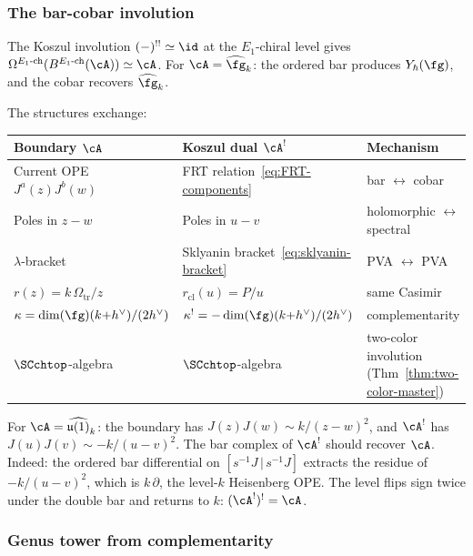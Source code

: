 \subsubsection*{The bar-cobar involution}

The Koszul involution $(-)^{!!} \simeq \id$ at the
$E_1$-chiral level gives
$\Omega^{E_1\text{-ch}}(B^{E_1\text{-ch}}(\cA)) \simeq \cA$.
For $\cA = \widehat{\fg}_k$: the ordered bar produces
$Y_\hbar(\fg)$, and the cobar recovers $\widehat{\fg}_k$.

The structures exchange:
\begin{center}
\small
\renewcommand{\arraystretch}{1.15}
\begin{tabular}{lll}
\textbf{Boundary $\cA$} &
 \textbf{Koszul dual $\cA^!$} &
 \textbf{Mechanism} \\
\hline
Current OPE $J^a(z)J^b(w)$ &
 FRT relation~\eqref{eq:FRT-components} &
 bar $\leftrightarrow$ cobar \\[2pt]
Poles in $z - w$ &
 Poles in $u - v$ &
 holomorphic $\leftrightarrow$ spectral \\[2pt]
$\lambda$-bracket &
 Sklyanin bracket~\eqref{eq:sklyanin-bracket} &
 PVA $\leftrightarrow$ PVA \\[2pt]
$r(z) = k\,\Omega_{\mathrm{tr}}/z$ &
 $r_{\mathrm{cl}}(u) = P/u$ &
 same Casimir \\[2pt]
$\kappa = \dim(\fg)(k{+}h^\vee)/(2h^\vee)$ &
 $\kappa^! = -\dim(\fg)(k{+}h^\vee)/(2h^\vee)$ &
 complementarity \\[2pt]
$\SCchtop$-algebra &
 $\SCchtop$-algebra &
 two-color involution (Thm~\ref{thm:two-color-master})
\end{tabular}
\end{center}

\begin{computation}
For $\cA = \widehat{\mathfrak{u}(1)}_k$: the boundary has
$J(z)J(w) \sim k/(z-w)^2$, and $\cA^!$ has
$J(u)J(v) \sim -k/(u-v)^2$. The bar complex of $\cA^!$
should recover $\cA$. Indeed: the ordered bar differential on
$[s^{-1}J \,|\, s^{-1}J]$ extracts the
residue of $-k/(u-v)^2$, which is $k\,\partial$, the level-$k$
Heisenberg OPE. The level flips sign twice under the double
bar and returns to $k$: $(\cA^!)^! = \cA$.
\end{computation}

\subsubsection*{Genus tower from complementarity}


